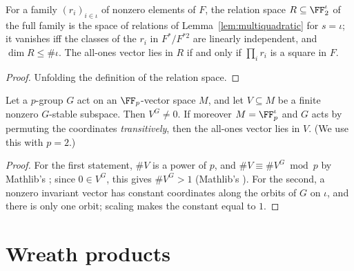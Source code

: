 \begin{lemma}
  \label{lem:relations}
  \leanok
  For a family $(r_i)_{i \in \iota}$ of nonzero elements of $F$, the relation space
  $R \subseteq \FF_2^{\iota}$ of the full family is the space of relations of
  Lemma~\ref{lem:multiquadratic} for $s = \iota$; it vanishes iff the classes of the $r_i$ in
  $F^*/F^{*2}$ are linearly independent, and $\dim R \le \#\iota$. The all-ones vector lies in
  $R$ if and only if $\prod_i r_i$ is a square in $F$.
\end{lemma}
\begin{proof}
  \leanok
  Unfolding the definition of the relation space.
\end{proof}

\begin{lemma}
  \label{lem:invariant}
  \leanok
  Let a $p$-group $G$ act on an $\FF_p$-vector space $M$, and let $V \subseteq M$ be a finite
  nonzero $G$-stable subspace. Then $V^G \ne 0$. If moreover $M = \FF_p^{\iota}$ and $G$ acts by
  permuting the coordinates \emph{transitively}, then the all-ones vector lies in $V$.
  (We use this with $p = 2$.)
\end{lemma}
\begin{proof}
  \leanok
  For the first statement, $\#V$ is a power of $p$, and $\#V \equiv \#V^G \bmod p$ by Mathlib's
  ; since $0 \in V^G$, this gives $\#V^G > 1$
  (Mathlib's ).
  For the second, a nonzero invariant vector has constant coordinates along the orbits of $G$ on
  $\iota$, and there is only one orbit; scaling makes the constant equal to $1$.
\end{proof}

\section{Wreath products}

